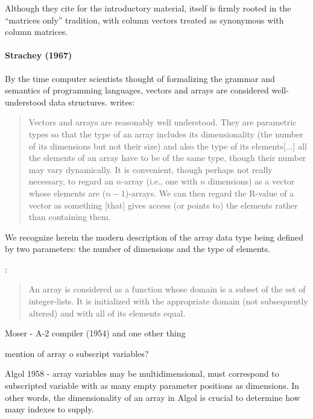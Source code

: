 Although they cite \cite{Faddeev1959} for the introductory material, \cite{Faddeev1959} itself is firmly rooted in the ``matrices only'' tradition, with column vectors treated as synonymous with column matrices.



\paragraph{Strachey (1967)~\cite{Strachey1967}}

By the time computer scientists thought of formalizing the grammar and semantics of programming languages,
vectors and arrays are considered well-understood data structures. \cite[\S 3.7.7, pp. 43--44]{Strachey1967} writes:
\begin{quote}
Vectors and arrays are reasonably well understood. They are parametric types so that the type of an array includes its dimensionality (the number of
its dimensions but not their size) and also the type of its elements[...]
all the elements of an array have to be of the same type, though their number may vary dynamically.
It is convenient, though perhaps not really necessary, to regard an $n$-array
(i.e., one with $n$ dimensions) as a vector whose elements are ($n-1$)-arrays.
We can then regard the R-value of a vector as something [that] gives access (or points to) the elements rather than containing them.
\end{quote}
We recognize herein the modern description of the array data type being defined by
two parameters: the number of dimensions and the type of elements.

\cite{Landin1965}:
\begin{quote}
An array is considered as a function whose domain is a subset of the set of integer-lists.
It is initialized with the appropriate domain (not subsequently altered) and with all of its elements equal.
\end{quote}


Moser - A-2 compiler (1954) and one other thing

mention of array o subscript variables?



Algol 1958 - array variables may be multidimensional, must correspond to subscripted variable with as many empty parameter positions as dimensions.
In other words, the dimensionality of an array in Algol is crucial to determine how many indexes to supply.

